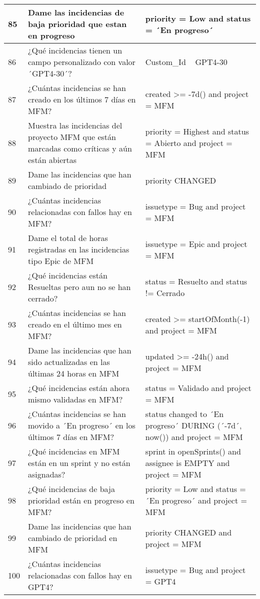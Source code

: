 \begin{center}
\begin{longtable}{ | p{1cm} | p{8cm} | p{6cm} | }
        \hline
        85 & Dame las incidencias de baja prioridad que estan en progreso & priority = Low and status = ´En progreso´ \\
        \hline
        86 & ¿Qué incidencias tienen un campo personalizado con valor ´GPT4-30´? & Custom\_Id ~ GPT4-30 \\
        \hline
        87 & ¿Cuántas incidencias se han creado en los últimos 7 días en MFM? & created >= -7d() and project = MFM \\
        \hline
        88 & Muestra las incidencias del proyecto MFM que están marcadas como críticas y aún están abiertas & priority = Highest and status = Abierto and project = MFM \\
        \hline
        89 & Dame las incidencias que han cambiado de prioridad & priority CHANGED \\
        \hline
        90 & ¿Cuántas incidencias relacionadas con fallos hay en MFM? & issuetype = Bug and project = MFM \\
        \hline
        91 & Dame el total de horas registradas en las incidencias tipo Epic de MFM & issuetype = Epic and project = MFM \\
        \hline
        92 & ¿Qué incidencias están Resueltas pero aun no se han cerrado? & status = Resuelto and status != Cerrado \\
        \hline
        93 & ¿Cuántas incidencias se han creado en el último mes en MFM? & created >= startOfMonth(-1) and project = MFM \\
        \hline
        94 & Dame las incidencias que han sido actualizadas en las últimas 24 horas en MFM & updated >= -24h() and project = MFM \\
        \hline
        95 & ¿Qué incidencias están ahora mismo validadas en MFM? & status = Validado and project = MFM \\
        \hline
        96 & ¿Cuántas incidencias se han movido a ´En progreso´ en los últimos 7 días en MFM? & status changed to ´En progreso´ DURING (´-7d´, now()) and project = MFM \\
        \hline
        97 & ¿Qué incidencias en MFM están en un sprint y no están asignadas? & sprint in openSprints() and assignee is EMPTY and project = MFM \\
        \hline
        98 & ¿Qué incidencias de baja prioridad están en progreso en MFM? & priority = Low and status = ´En progreso´ and project = MFM \\
        \hline
        99 & Dame las incidencias que han cambiado de prioridad en MFM & priority CHANGED and project = MFM \\
        \hline
        100 & ¿Cuántas incidencias relacionadas con fallos hay en GPT4? & issuetype = Bug and project = GPT4 \\
        \hline
        
    \end{longtable}
        
\end{center}

